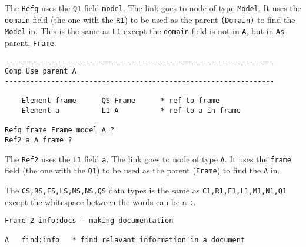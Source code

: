 \documentclass[11pt]{article}
\begin{document}
The \texttt{Refq} uses the \texttt{Q1} field \texttt{model}. The link
goes to node of type \texttt{Model}. It uses the \texttt{domain} field
(the one with the \texttt{R1}) to be used as the parent
\texttt{(Domain)} to find the \texttt{Model} in. This is the same as
\texttt{L1} except the \texttt{domain} field is not in \texttt{A}, but
in \texttt{A\textquotesingle{}s} parent, \texttt{Frame}.

\begin{verbatim}
----------------------------------------------------------------
Comp Use parent A
----------------------------------------------------------------

    Element frame      QS Frame      * ref to frame
    Element a          L1 A          * ref to a in frame

Refq frame Frame model A ?
Ref2 a A frame ?
\end{verbatim}

The \texttt{Ref2} uses the \texttt{L1} field \texttt{a}. The link goes
to node of type \texttt{A}. It uses the \texttt{frame} field (the one
with the \texttt{Q1}) to be used as the parent (\texttt{Frame}) to find
the \texttt{A} in.

The \texttt{CS,RS,FS,LS,MS,NS,QS} data types is the same as
\texttt{C1,R1,F1,L1,M1,N1,Q1} except the whitespace between the words
can be a \texttt{:}.

\begin{verbatim}
Frame 2 info:docs - making documentation

A   find:info   * find relavant information in a document
\end{verbatim}
\end{document}
